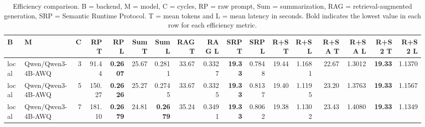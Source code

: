 \begin{table}[t]
\centering
\setlength{\tabcolsep}{4pt}
\scriptsize
\begin{tabular}{llrrrrrrrrrrrrrrr}
\toprule
B & M & C & RP T & RP L & Sum T & Sum L & RAG T & RAG L & SRP T & SRP L & R+S T & R+S L & R+SA T & R+SA L & R+S2 T & R+S2 L \\
\midrule
local & Qwen/Qwen3-4B-AWQ & 3 & 91.44 & \textbf{0.2607} & 25.67 & 0.2811 & 33.67 & 0.3327 & \textbf{19.33} & 0.7848 & 19.44 & 1.1681 & 22.67 & 1.3012 & \textbf{19.33} & 1.1370 \\
local & Qwen/Qwen3-4B-AWQ & 5 & 150.27 & \textbf{0.2626} & 25.27 & 0.2745 & 33.67 & 0.3325 & \textbf{19.33} & 0.8137 & 19.40 & 1.1195 & 23.20 & 1.3763 & \textbf{19.33} & 1.1567 \\
local & Qwen/Qwen3-4B-AWQ & 7 & 181.10 & \textbf{0.2679} & 24.81 & \textbf{0.2679} & 35.24 & 0.3491 & \textbf{19.33} & 0.8062 & 19.38 & 1.1302 & 23.43 & 1.4080 & \textbf{19.33} & 1.1349 \\
\bottomrule
\end{tabular}
\caption{Efficiency comparison. B = backend, M = model, C = cycles, RP = raw prompt, Sum = summarization, RAG = retrieval-augmented generation, SRP = Semantic Runtime Protocol. T = mean tokens and L = mean latency in seconds. Bold indicates the lowest value in each row for each efficiency metric.}
\label{tab:srp-efficiency-table}
\end{table}
